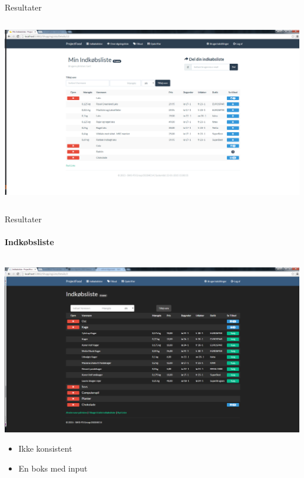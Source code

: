\begin{frame}{Resultater}
\begin{minipage}[0.3\textheight]{\textwidth}
\begin{columns}[T]
\begin{column}{0.5\textwidth}
	  \includegraphics[width=1\textwidth,height=1\textheight,keepaspectratio, trim={1cm 0 0 16mm}, clip]{images/Screenshots/ShoppingList.png}
	\end{column}
	\end{columns}
	

  \end{minipage}
	
\end{frame}
\begin{frame}{Resultater}
\framesubtitle{Indkøbsliste}

	\begin{minipage}[0.3\textheight]{\textwidth}
	\begin{columns}[T]
	\begin{column}{1\textwidth}
	 \vspace{-15 pt}
	 \includegraphics[width=1\textwidth,height=1\textheight,keepaspectratio, trim={1cm 0 0 16mm}, clip]{images/Screenshots/ShoppingListOffersOld.png}
	
	\begin{itemize}
		\item Ikke konsistent
		\item En boks med input
	\end{itemize}
	\end{column}

	\end{columns}

  \end{minipage}
	
\end{frame}
